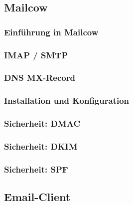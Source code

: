 \subsection{Mailcow}

\subsubsection{Einführung in Mailcow}

\subsubsection{IMAP / SMTP}

\subsubsection{DNS MX-Record}

\subsubsection{Installation und Konfiguration}

\subsubsection{Sicherheit: DMAC}

\subsubsection{Sicherheit: DKIM}

\subsubsection{Sicherheit: SPF}

\subsection{Email-Client}

